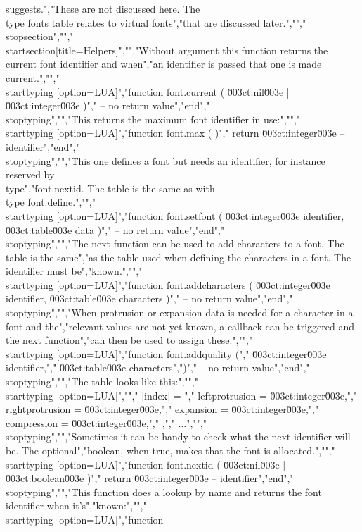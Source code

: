 suggests.","These are not discussed here. The \\type {fonts} table relates to virtual fonts","that are discussed later.","","\\stopsection","","\\startsection[title=Helpers]","","Without argument this function returns the current font identifier and when","an identifier is passed that one is made current.","","\\starttyping [option=LUA]","function font.current ( \u003ct:nil\u003e | \u003ct:integer\u003e )","    -- no return value","end","\\stoptyping","","This returns the maximum font identifier in use:","","\\starttyping [option=LUA]","function font.max ( )","    return \u003ct:integer\u003e -- identifier","end","\\stoptyping","","This one defines a font but needs an identifier, for instance reserved by \\type","{font.nextid}. The table is the same as with \\type {font.define}.","","\\starttyping [option=LUA]","function font.setfont ( \u003ct:integer\u003e identifier, \u003ct:table\u003e data )","    -- no return value","end","\\stoptyping","","The next function can be used to add characters to a font. The table is the same","as the table used when defining the characters in a font. The identifier must be","known.","","\\starttyping [option=LUA]","function font.addcharacters ( \u003ct:integer\u003e identifier, \u003ct:table\u003e characters )","    -- no return value","end","\\stoptyping","","When protrusion or expansion data is needed for a character in a font and the","relevant values are not yet known, a callback can be triggered and the next function","can then be used to assign these.","","\\starttyping [option=LUA]","function font.addquality (","    \u003ct:integer\u003e identifier,","    \u003ct:table\u003e   characters",")","    -- no return value","end","\\stoptyping","","The table looks like this:","","\\starttyping [option=LUA]","{","    [index] = {","        leftprotrusion  = \u003ct:integer\u003e,","        rightprotrusion = \u003ct:integer\u003e,","        expansion       = \u003ct:integer\u003e,","        compression     = \u003ct:integer\u003e,","    },","    ...","}","\\stoptyping","","Sometimes it can be handy to check what the next identifier will be. The optional","boolean, when true, makes that the font is allocated.","","\\starttyping [option=LUA]","function font.nextid ( \u003ct:nil\u003e | \u003ct:boolean\u003e )","    return \u003ct:integer\u003e -- identifier","end","\\stoptyping","","This function does a lookup by name and returns the font identifier when it's","known:","","\\starttyping [option=LUA]","function 